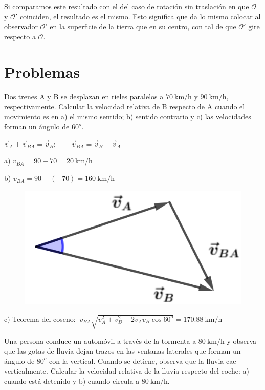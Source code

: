 Si comparamos este resultado con el del caso de rotación sin traslación en que $\mathcal O$ y $\mathcal O'$ coinciden, el resultado es el mismo. Esto significa que da lo mismo colocar al observador $\mathcal O'$ en la superficie de la tierra que en su centro, con tal de que $\mathcal O'$ gire respecto a $\mathcal O$.

\section{Problemas}
\begin{prob}
Dos trenes A y B se desplazan en rieles paralelos a $70\ \mathrm{km/h}$ y $90\ \mathrm{km/h}$, respectivamente. Calcular la velocidad relativa de B respecto de A cuando el movimiento es en a) el mismo sentido; b) sentido contrario y c) las velocidades forman un ángulo de $60^o$. 	
\end{prob}

\begin{multicols}{2}
	
	$\vec v_A+\vec v_{BA}=\vec v_B; \qquad \vec v_{BA}=\vec v_B-\vec v_A$
	
	a) $ v_{BA}=90-70=20\ \text{km/h}$
	
	b)  $ v_{BA}=90-(-70)=160\ \text{km/h}$
	\begin{figure}[H]
	\centering
	\includegraphics[width=.3\textwidth]{imagenes/imagenes10/T10IM06.png}
\end{figure}
\end{multicols}
c) Teorema del coseno: $\ v_{BA}\sqrt{v_A^2+v_B^2-2v_Av_B\cos 60^o}=170.88\ \text{km/h}$

\begin{prob}
Una persona conduce	un automóvil a través de la tormenta a $80\ \mathrm{km/h}$ y observa que las gotas de lluvia dejan trazos en las ventanas laterales que forman un ángulo de $80^o$ con la vertical. Cuando se detiene, observa que la lluvia cae verticalmente. Calcular la velocidad relativa de la lluvia respecto del coche: a) cuando está detenido y b) cuando circula a $80\ \mathrm{km/h}$.
\end{prob}

